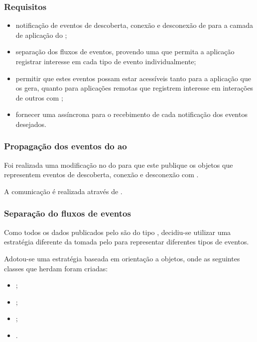 \documentclass[aspectratio=169]{beamer}
\begin{document}
\begin{frame}
	\frametitle{Requisitos}
	\begin{itemize}
		\item notificação de eventos de descoberta, conexão e desconexão de \smartobjs para a camada de aplicação do \software;

		\item separação dos fluxos de eventos, provendo uma \api que permita a aplicação registrar interesse em cada tipo de evento individualmente;

		\item permitir que estes eventos possam estar acessíveis tanto para a aplicação que os gera, quanto para aplicações remotas que registrem interesse em interações de outros \smartphones com \smartobjs;

		\item fornecer uma \api assíncrona para o recebimento de cada notificação dos eventos desejados.
	\end{itemize}
\end{frame}

\begin{frame}
	\frametitle{Propagação dos eventos do \stwopa ao \cddl}
	Foi realizada uma modificação no \stwopa do \mhub para que este publique os objetos \sensordata que representem eventos de descoberta, conexão e desconexão com \smartobjs.

	\bigskip

	A comunicação é realizada através de \eventbus.
\end{frame}

\begin{frame}
	\frametitle{Separação do fluxos de eventos}
	Como todos os dados publicados pelo \cddl são do tipo \msg, decidiu-se utilizar uma estratégia diferente da tomada pelo \stwopa para representar diferentes tipos de eventos.

	\bigskip

	Adotou-se uma estratégia baseada em orientação a objetos, onde as seguintes classes que herdam \msg foram criadas:
	\begin{itemize}
		\item \objfoundmsg;
		\item \objconnectedmsg;
		\item \objdisconnectedmsg;
		\item \sensordatamsg.
	\end{itemize}
\end{frame}
\end{document}
